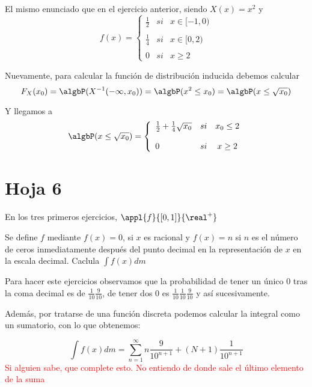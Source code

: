 \begin{problem}[9]
El mismo enunciado que en el ejercicio anterior, siendo $X(x)=x^2$ y
\[
f(x)= \left\{ \begin{array}{lcc}
             \frac{1}{2} &   si  & x \in  [-1, 0) \\
             \\ \frac{1}{4} & si & x \in [0,2) \\
             \\ 0 &  si & x \geq 2
             \end{array}
   \right.
\]

\solution

Nuevamente, para calcular la función de distribución inducida debemos calcular
\[F_X(x_0) = \algbP(X^{-1}(-\infty, x_0)) = \algbP (x^2 \leq x_0) = \algbP (x \leq \sqrt{x_0})\]

Y llegamos a
\[
\algbP (x \leq \sqrt{x_0})= \left\{ \begin{array}{lcc}
              \frac{1}{2} + \frac{1}{4}\sqrt{x_0} & si & x_0 \leq 2 \\
             \\ 0 &  si & x \geq 2
             \end{array}
   \right.
\]
\end{problem}

\section{Hoja 6}
En los tres primeros ejercicios, $\appl{f}{[0,1]}{\real^+}$

\begin{problem}[1]
Se define $f$ mediante $f(x) = 0 $, si $x$ es racional y $f(x)=n$ si $n$ es el número de ceros inmediatamente después del punto decimal en la representación de $x$ en la escala decimal. Caclula $\int f(x) dm$

\solution
Para hacer este ejercicios observamos que la probabilidad de tener un único 0 tras la coma decimal es de $\frac{1}{10}\frac{9}{10}$, de tener dos 0 es $\frac{1}{10}\frac{1}{10}\frac{9}{10}$ y así sucesivamente.

Además, por tratarse de una función discreta podemos calcular la integral como un sumatorio, con lo que obtenemos:

\[\int f(x) dm = \sum_{n=1}^{\infty} n \frac{9}{10^{n+1}} + (N+1) \frac{1}{10^{n+1}}\]
\textcolor{red}{Si alguien sabe, que complete esto. No entiendo de donde sale el último elemento de la suma}

\end{problem}

